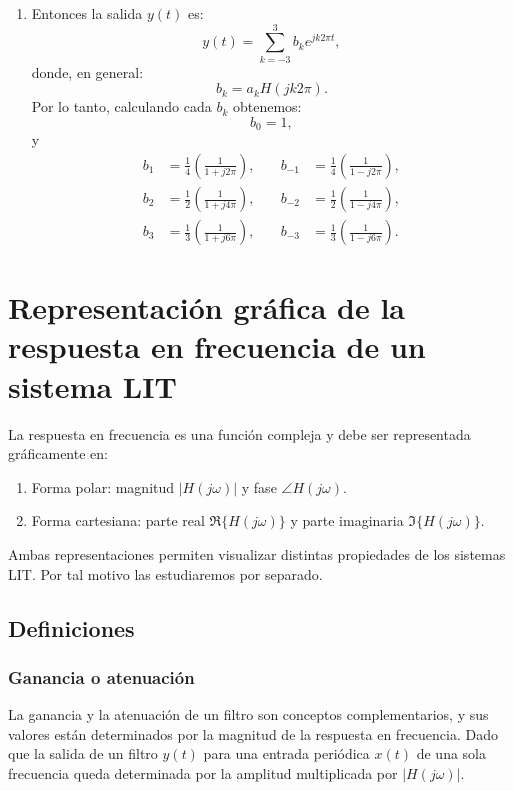 \documentclass[11pt,a4paper,openany]{book}
\begin{document}
\begin{enumerate}
	\item Entonces la salida $y(t)$ es:
	\begin{equation}
		y(t) = \sum_{k=-3}^{3} b_{k} e^{jk2\pi t},
	\end{equation}
	donde, en general:
	\begin{equation}
		b_{k} = a_{k} H(jk2\pi).
	\end{equation}
	Por lo tanto, calculando cada $b_{k}$ obtenemos:
	\begin{equation}
		b_{0} = 1,
	\end{equation}
	y
	\begin{equation}
		\begin{aligned}
			b_{1} &= \frac{1}{4}\left( \frac{1}{1+j2\pi} \right), \quad &
			b_{-1} &= \frac{1}{4}\left( \frac{1}{1-j2\pi} \right), \\
			b_{2} &= \frac{1}{2}\left( \frac{1}{1+j4\pi} \right), \quad &
			b_{-2} &= \frac{1}{2}\left( \frac{1}{1-j4\pi} \right), \\
			b_{3} &= \frac{1}{3}\left( \frac{1}{1+j6\pi} \right), \quad &
			b_{-3} &= \frac{1}{3}\left( \frac{1}{1-j6\pi} \right).
		\end{aligned}
	\end{equation}
\end{enumerate}

\section{Representaci\'{o}n gr\'{a}fica de la respuesta en frecuencia de un sistema LIT}

La respuesta en frecuencia es una funci\'{o}n compleja y debe ser representada gr\'{a}ficamente en:
\begin{enumerate}
	\item Forma polar: magnitud $|H(j\omega)|$ y fase $\angle H(j\omega)$.
	\item Forma cartesiana: parte real $\Re\{H(j\omega)\}$ y parte imaginaria $\Im\{H(j\omega)\}$.
\end{enumerate}

Ambas representaciones permiten visualizar distintas propiedades de los sistemas LIT. Por tal motivo las estudiaremos por separado.

\subsection{Definiciones}

\subsubsection{Ganancia o atenuaci\'{o}n}
La ganancia y la atenuaci\'{o}n de un filtro son conceptos complementarios, y sus valores est\'{a}n determinados por la magnitud de la respuesta en frecuencia. Dado que la salida de un filtro $y(t)$ para una entrada peri\'{o}dica $x(t)$ de una sola frecuencia queda determinada por la amplitud multiplicada por $|H(j\omega)|$.
\end{document}
